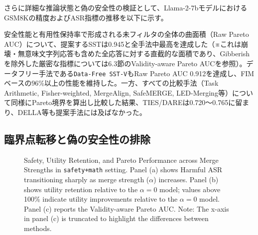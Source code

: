 \documentclass{article}
\begin{document}
さらに詳細な推論状態と偽の安全性の検証として、Llama-2-7bモデルにおけるGSM8Kの精度およびASR指標の推移を以下に示す。

\begin{table}[H]
\centering
\caption{崩壊分析: safety+math条件におけるDiagonal SST-Merge(GSM8K対象)の詳細指標と偽の安全性}
\label{tab:evaluation_yobi_main_GSM8K}
\small
{}
\end{table}

安全性能と有用性保持率で形成される未フィルタの全体の曲面積（Raw Pareto AUC）について、提案するSSTは0.945と全手法中最高を達成した（※これは崩壊・無意味文字列応答も含めた全応答に対する直截的な面積であり、Gibberishを除外した厳密な指標については6.3節のValidity-aware Pareto AUCを参照）。データフリー手法である\texttt{Data-Free SST-V}もRaw Pareto AUC 0.912を達成し、FIMベースの96\%以上の性能を維持した。一方、すべての比較手法（Task Arithmetic, Fisher-weighted, MergeAlign, SafeMERGE, LED-Merging等）について同様にPareto境界を算出し比較した結果、TIES/DAREは0.720〜0.765に留まり、DELLA等も提案手法には及ばなかった。

\subsection{臨界点転移と偽の安全性の排除}

\begin{figure}[t]
\centering
\caption{Safety, Utility Retention, and Pareto Performance across Merge Strengths in \texttt{safety+math} setting. Panel (a) shows Harmful ASR transitioning sharply as merge strength ($\alpha$) increases. Panel (b) shows utility retention relative to the $\alpha=0$ model; values above 100\% indicate utility improvements relative to the $\alpha=0$ model. Panel (c) reports the Validity-aware Pareto AUC. Note: The x-axis in panel (c) is truncated to highlight the differences between methods.}
\label{fig:pareto_three_panel}
\end{figure}
\end{document}
